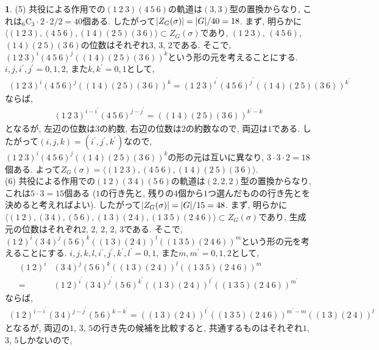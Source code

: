 \documentclass{article}
\theoremstyle{definition}
\newtheorem{ans}{}
\numberwithin{ans}{subsection}
\DeclarePairedDelimiter{\abs}{\lvert}{\rvert}
\begin{document}
\begin{ans}
  (5) 共役による作用での$(1\ 2\ 3)(4\ 5\ 6)$の軌道は$(3, 3)$型の置換からなり, これは${}_6\mathrm{C}_3 \cdot 2 \cdot 2 / 2 = 40$個ある.
  したがって$\abs{Z_G(\sigma)} = \abs{G}/40 = 18$.
  まず, 明らかに$\langle (1\ 2\ 3), (4\ 5\ 6), (1\ 4)(2\ 5)(3\ 6) \rangle \subset Z_G(\sigma)$であり,
  $(1\ 2\ 3)$, $(4\ 5\ 6)$, $(1\ 4)(2\ 5)(3\ 6)$の位数はそれぞれ$3$, $3$, $2$である.
  そこで, $(1\ 2\ 3)^i(4\ 5\ 6)^j((1\ 4)(2\ 5)(3\ 6))^k$という形の元を考えることにする.
  $i, j, i^\prime, j^\prime = 0, 1, 2$, また$k, k^\prime = 0, 1$として,
  \begin{align*}
    (1\ 2\ 3)^i(4\ 5\ 6)^j((1\ 4)(2\ 5)(3\ 6))^k = (1\ 2\ 3)^{i^\prime}(4\ 5\ 6)^{j^\prime}((1\ 4)(2\ 5)(3\ 6))^{k^\prime}
  \end{align*}
  ならば,
  \begin{align*}
    (1\ 2\ 3)^{i-i^\prime}(4\ 5\ 6)^{j-j^\prime} = ((1\ 4)(2\ 5)(3\ 6))^{k^\prime - k}
  \end{align*}
  となるが, 左辺の位数は$3$の約数, 右辺の位数は$2$の約数なので, 両辺は$1$である.
  したがって$(i, j, k) = (i^\prime, j^\prime, k^\prime)$なので,
  $(1\ 2\ 3)^i(4\ 5\ 6)^j((1\ 4)(2\ 5)(3\ 6))^k$の形の元は互いに異なり, $3 \cdot 3 \cdot 2 = 18$個ある.
  よって$Z_G(\sigma) = \langle (1\ 2\ 3), (4\ 5\ 6), (1\ 4)(2\ 5)(3\ 6) \rangle$.\\
  (6) 共役による作用での$(1\ 2)(3\ 4)(5\ 6)$の軌道は$(2, 2, 2)$型の置換からなり, これは$5 \cdot 3 = 15$個ある ($1$の行き先と, 残りの$4$個から$1$つ選んだものの行き先とを決めると考えればよい).
  したがって$\abs{Z_G(\sigma)} = \abs{G}/15 = 48$.
  まず, 明らかに$\langle (1\ 2), (3\ 4), (5\ 6), (1\ 3)(2\ 4), (1\ 3\ 5)(2\ 4\ 6) \rangle \subset Z_G(\sigma)$であり,
  生成元の位数はそれぞれ$2$, $2$, $2$, $2$, $3$である.
  そこで, $(1\ 2)^i(3\ 4)^j(5\ 6)^k((1\ 3)(2\ 4))^l((1\ 3\ 5)(2\ 4\ 6))^m$という形の元を考えることにする.
  $i, j, k, l, i^\prime, j^\prime, k^\prime, l^\prime = 0, 1$, また$m, m^\prime = 0, 1, 2$として,
  \begin{align*}
    (1\ 2)^i&(3\ 4)^j(5\ 6)^k((1\ 3)(2\ 4))^l((1\ 3\ 5)(2\ 4\ 6))^m\\
    = &(1\ 2)^{i^\prime}(3\ 4)^{j^\prime}(5\ 6)^{k^\prime}((1\ 3)(2\ 4))^{l^\prime}((1\ 3\ 5)(2\ 4\ 6))^{m^\prime}
  \end{align*}
  ならば,
  \begin{align*}
    (1\ 2)^{i - i^\prime}(3\ 4)^{j - j^\prime}(5\ 6)^{k - k^\prime}
     = ((1\ 3)(2\ 4))^{l^\prime}((1\ 3\ 5)(2\ 4\ 6))^{m^\prime - m}((1\ 3)(2\ 4))^l
  \end{align*}
  となるが, 両辺の$1$, $3$, $5$の行き先の候補を比較すると, 共通するものはそれぞれ$1$, $3$, $5$しかないので,

\end{ans}
\end{document}
